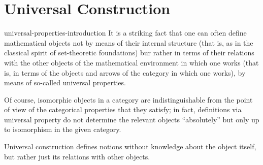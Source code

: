 \documentclass[preview]{standalone}
\begin{document}
\genpage

\section{Universal Construction}

\begin{snippet}{universal-properties-introduction}
    It is a striking fact that one can often define mathematical
    objects not by means of their internal structure (that is, as in
    the classical spirit of set-theoretic foundations) bur rather in
    terms of their relations with the other objects of the
    mathematical environment in which one works (that is, in
    terms of the objects and arrows of the category in which one
    works), by means of so-called universal properties.

    Of course, isomorphic objects in a category are
    indistinguishable from the point of view of the categorical
    properties that they satisfy; in fact, definitions via universal
    property do not determine the relevant objects ``absolutely''
    but only up to isomorphism in the given category.

    Universal construction defines notions without knowledge about the object itself,
    but rather just its relations with other objects.
\end{snippet}
\end{document}
